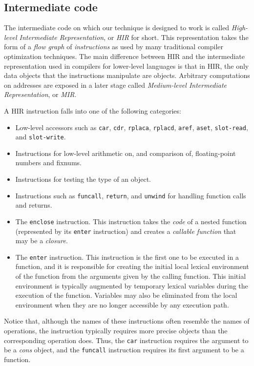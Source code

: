 \subsection{Intermediate code}

The intermediate code on which our technique is designed to work is
called \emph{High-level Intermediate Representation}, or \emph{HIR}
for short.  This representation takes the form of a \emph{flow graph}
of \emph{instructions} as used by many traditional compiler
optimization techniques.  The main difference between HIR and the
intermediate representation used in compilers for lower-level
languages is that in HIR, the only data objects that the instructions
manipulate are \commonlisp{} objects.  Arbitrary computations on
addresses are exposed in a later stage called \emph{Medium-level
  Intermediate Representation}, or \emph{MIR}.

A HIR instruction falls into one of the following categories:

\begin{itemize}
\item Low-level accessors such as \texttt{car}, \texttt{cdr},
  \texttt{rplaca}, \texttt{rplacd}, \texttt{aref}, \texttt{aset},
  \texttt{slot-read}, and \texttt{slot-write}.
\item Instructions for low-level arithmetic on, and comparison of,
  floating-point numbers and fixnums.
\item Instructions for testing the type of an object.
\item Instructions such as \texttt{funcall}, \texttt{return}, and
  \texttt{unwind} for handling function calls and returns.
\item The \texttt{enclose} instruction.  This instruction takes the
  \emph{code} of a nested function (represented by its \texttt{enter}
  instruction) and creates a \emph{callable function} that may be a
  \emph{closure}.
\item The \texttt{enter} instruction.  This instruction is the first
  one to be executed in a function, and it is responsible for creating
  the initial local lexical environment of the function from the
  arguments given by the calling function.  This initial environment
  is typically augmented by temporary lexical variables during the
  execution of the function.  Variables may also be eliminated from
  the local environment when they are no longer accessible by any
  execution path.
\end{itemize}

Notice that, although the names of these instructions often resemble
the names of \commonlisp{} operations, the instruction typically
requires more precise objects than the corresponding \commonlisp{}
operation does.  Thus, the \texttt{car} instruction requires the
argument to be a \emph{cons} object, and the \texttt{funcall}
instruction requires its first argument to be a function.

